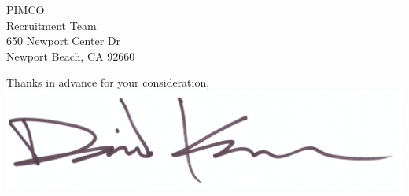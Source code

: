 \documentclass{letter}
\begin{document}
\begin{letter}{
  PIMCO \\
  Recruitment Team \\
  650 Newport Center Dr \\
  Newport Beach, CA 92660
}
\closing{
  Thanks in advance for your consideration, \\
  \vspace{.33in}
  \includegraphics[scale=0.33]{signature.png}
}

\end{letter}
\end{document}
